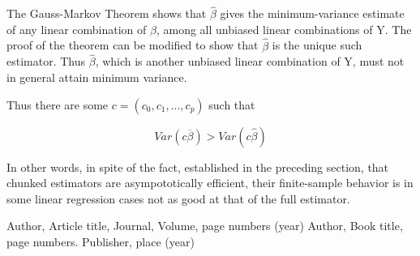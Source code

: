 The Gauss-Markov Theorem shows that $\widehat{\beta}$ gives the
minimum-variance estimate of any linear combination of $\beta$, among
all unbiased linear combinations of Y.  The proof of the theorem can be
modified to show that $\widehat{\beta}$ is the unique such estimator.
Thus $\widehat{\beta}$, which is another unbiased linear combination of
Y, must not in general attain minimum variance.

Thus there are some $c = (c_0,c_1,...,c_p)$ such that

\begin{equation}
Var(c \overline{\beta}) > Var(c \widehat{\beta}) 
\end{equation}

\noindent
In other words, in spite of the fact, established in the preceding
section, that chunked estimators are asympototically efficient, their
finite-sample behavior is in some linear regression cases not as good at
that of the full estimator.


\begin{thebibliography}{}
%
%
Author, Article title, Journal, Volume, page numbers (year)
Author, Book title, page numbers. Publisher, place (year)
\end{thebibliography}



